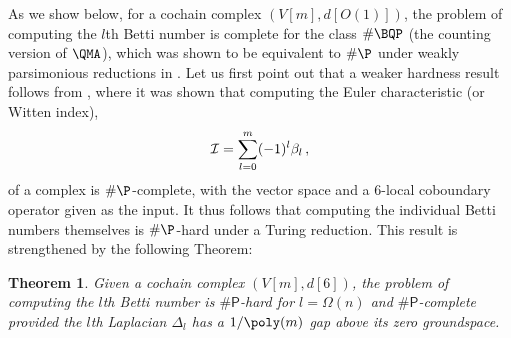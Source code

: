 \documentclass[11pt]{article}
\numberwithin{equation}{section}
\def\cI{{\cal I}}
\newcommand\equ[1] {\begin{equation}#1\end{equation}}
\renewcommand\( {\left(}
\renewcommand\) {\right)}
\newtheorem{thm}{Theorem}
\newcommand{\sharpP}{\mathsf{\#P}}
\begin{document}
As we show below, for a cochain complex $(V[m],d[O(1)])$, the problem of computing the $l$th Betti number is complete for the class $\#\BQP$ (the counting version of $\QMA$), which was shown to be equivalent to $\#\P$ under weakly parsimonious reductions in \cite{Brown_2011}. Let us first point out that a weaker hardness result follows from \cite{Crichigno:2020vue}, where it was shown that computing the Euler characteristic (or Witten index), 
\equ{\cI=\sum_{l=0}^{m} (-1)^l\beta_l\,,
} 
of a complex is $\#\P$-complete, with the vector space and a $6$-local coboundary operator given as the input. It thus follows that computing the individual Betti numbers themselves is $\#\P$-hard under a Turing reduction. This result is strengthened by the following Theorem:
\begin{thm}
    Given a cochain complex $(V[m],d[6])$, the problem of computing the $l$th Betti number is $\sharpP$-hard for $l = \Omega(n)$ and $\sharpP$-complete provided the $l$th Laplacian $\Delta_l$ has a $1/\poly(m)$ gap above its zero groundspace.
\end{thm}
\end{document}
